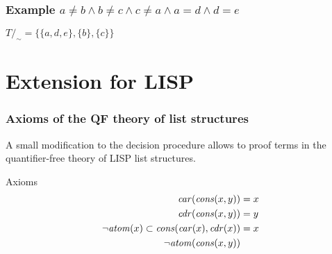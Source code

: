 \documentclass[fleqn,t]{beamer}
\newcommand{\car}[1]{\ensuremath\mathit{car}(#1)}
\newcommand{\cdr}[1]{\ensuremath\mathit{cdr}(#1)}
\newcommand{\cons}[1]{\ensuremath\mathit{cons}(#1)}
\newcommand{\atom}[1]{\ensuremath\mathit{atom}(#1)}
\begin{document}
\begin{frame}[fragile]
  \frametitle{Example $a \neq b \land b \neq c \land c \neq a \land a = d \land d = e$ }


  \pause

  $T/_\sim = \{ \{ a,d,e \}, \{ b \}, \{ c \} \}$
\end{frame}

\section{Extension for LISP}

\begin{frame}[t]
  \frametitle{Axioms of the QF theory of list structures}

  A small modification to the decision procedure allows to proof terms in the
  quantifier-free theory of LISP list structures.

  \begin{block}{Axioms}
    \vspace{-0.7cm}
    \begin{align*}
      \car{\cons{x,y}} &= x \\
      \cdr{\cons{x,y}} &= y \\
      \neg \atom{x} \subset \cons{\car{x}, \cdr{x}} &= x \\
      \neg \atom{\cons{x,y}} &
    \end{align*} \quad
  \end{block}
\end{frame}
\end{document}
